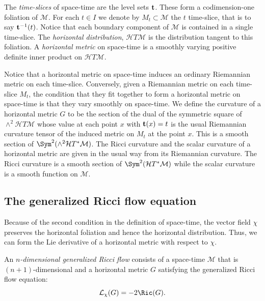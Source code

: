 \begin{definition}\label{def:time-slices-horizontal}
The {\em time-slices}
of space-time are the level sets ${\bf t}$. These form a
codimension-one foliation of ${\mathcal M}$. For each $t\in I$ we
denote by $M_t\subset {\mathcal M}$ the $t$ time-slice, that is to
say ${\bf t}^{-1}(t)$. Notice that each boundary component of
${\mathcal M}$ is contained in a single time-slice. The {\em
horizontal distribution}, ${\mathcal H}T{\mathcal M}$ is the
distribution tangent to this foliation. A {\em horizontal
metric} on
space-time is a smoothly varying positive definite inner product on
${\mathcal H}T{\mathcal M}$.
\end{definition}

Notice that a horizontal metric on space-time induces an ordinary
Riemannian metric on each time-slice. Conversely, given a Riemannian
metric on each time-slice $M_t$, the condition that they fit
together to form a horizontal metric on space-time is that they vary
smoothly on space-time. We define the curvature of a horizontal
metric $G$ to be the section of the dual of the symmetric square of
$\wedge^2{\mathcal H}T{\mathcal M}$ whose value at each point $x$ with ${\bf
t}(x)=t$ is the usual Riemannian curvature tensor of the induced
metric on $M_t$  at the point $x$. This is a smooth section of $\Sym^2(\wedge^2{\mathcal H}T^*{\mathcal M})$.
 The Ricci curvature and the scalar curvature of a horizontal metric
 are given in the usual way from its Riemannian curvature.
 The Ricci curvature is a smooth section of $\Sym^2({\mathcal
 H}T^*{\mathcal M})$ while the scalar curvature is a smooth function on ${\mathcal M}$.

\subsection{The generalized Ricci flow equation}



Because of the second condition in the definition of space-time, the
vector field $\chi$ preserves the horizontal foliation and hence the
horizontal distribution. Thus, we can form the Lie derivative of a
horizontal metric with respect to $\chi$.

\begin{definition}\label{def:generalized-ricci-flow}
An {\em $n$-dimensional generalized Ricci flow} consists of a space-time ${\mathcal M}$ that is
$(n+1)$-dimensional and a horizontal metric $G$ satisfying the
generalized Ricci flow equation:
$${\mathcal L}_\chi(G)=-2\Ric(G).$$
\end{definition}


